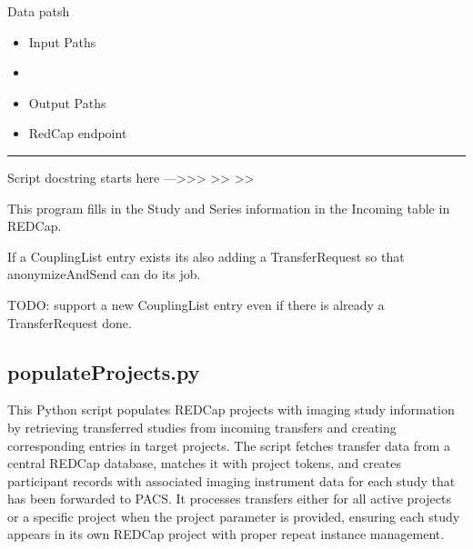 \documentclass[letterpaper,10pt,english]{sphinxmanual}
\begin{document}
\sphinxAtStartPar
{}


\sphinxAtStartPar
{}


\sphinxAtStartPar
Data patsh
\begin{itemize}
\item {} 
\sphinxAtStartPar
Input Paths

\end{itemize}
\begin{itemize}
\item {} 
\sphinxAtStartPar
{}

\end{itemize}
\begin{itemize}
\item {} 
\sphinxAtStartPar
Output Paths

\end{itemize}
\begin{itemize}
\item {} 
\sphinxAtStartPar
RedCap endpoint

\end{itemize}


\bigskip\hrule\bigskip


\sphinxAtStartPar
Script docstring starts here —\textgreater{}\textgreater{}\textgreater{}
\textendash{}\textgreater{}\textgreater{}
\textendash{}\textgreater{}\textgreater{}

\sphinxAtStartPar
This program fills in the Study and Series information in the Incoming table in REDCap.

\sphinxAtStartPar
If a CouplingList entry exists its also adding a TransferRequest so that anonymizeAndSend can do its job.

\sphinxAtStartPar
TODO: support a new CouplingList entry even if there is already a TransferRequest done.

\sphinxstepscope


\subsection{populateProjects.py}
\label{\detokenize{Architecture/scripts/populateProjects:populateprojects-py}}\label{\detokenize{Architecture/scripts/populateProjects::doc}}
\sphinxAtStartPar
This Python script populates REDCap projects with imaging study information by retrieving transferred studies from incoming transfers and creating corresponding entries in target projects. The script fetches transfer data from a central REDCap database, matches it with project tokens, and creates participant records with associated imaging instrument data for each study that has been forwarded to PACS. It processes transfers either for all active projects or a specific project when the \textendash{}project parameter is provided, ensuring each study appears in its own REDCap project with proper repeat instance management.
\end{document}
